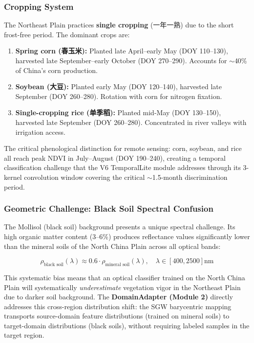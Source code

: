 \subsubsection{Cropping System}

The Northeast Plain practices \textbf{single cropping} (一年一熟) due to the
short frost-free period. The dominant crops are:

\begin{enumerate}[nosep]
    \item \textbf{Spring corn (春玉米):} Planted late April--early May (DOY 110--130),
    harvested late September--early October (DOY 270--290). Accounts for $\sim$40\%
    of China's corn production.
    \item \textbf{Soybean (大豆):} Planted early May (DOY 120--140), harvested late
    September (DOY 260--280). Rotation with corn for nitrogen fixation.
    \item \textbf{Single-cropping rice (单季稻):} Planted mid-May (DOY 130--150),
    harvested late September (DOY 260--280). Concentrated in river valleys with
    irrigation access.
\end{enumerate}

The critical phenological distinction for remote sensing: corn, soybean, and
rice all reach peak NDVI in July--August (DOY 190--240), creating a temporal
classification challenge that the V6 TemporalLite module addresses through
its 3-kernel convolution window covering the critical $\sim$1.5-month
discrimination period.

\subsubsection{Geometric Challenge: Black Soil Spectral Confusion}

The Mollisol (black soil) background presents a unique spectral challenge.
Its high organic matter content (3--6\%) produces reflectance values
significantly lower than the mineral soils of the North China Plain across
all optical bands:

\begin{equation}
    \rho_{\text{black soil}}(\lambda) \approx 0.6 \cdot \rho_{\text{mineral soil}}(\lambda),
    \quad \lambda \in [400, 2500]\text{nm}
\end{equation}

This systematic bias means that an optical classifier trained on the North China
Plain will systematically \textit{underestimate} vegetation vigor in the Northeast
Plain due to darker soil background. The \textbf{DomainAdapter (Module 2)} directly
addresses this cross-region distribution shift: the SGW barycentric mapping
transports source-domain feature distributions (trained on mineral soils) to
target-domain distributions (black soils), without requiring labeled samples
in the target region.

